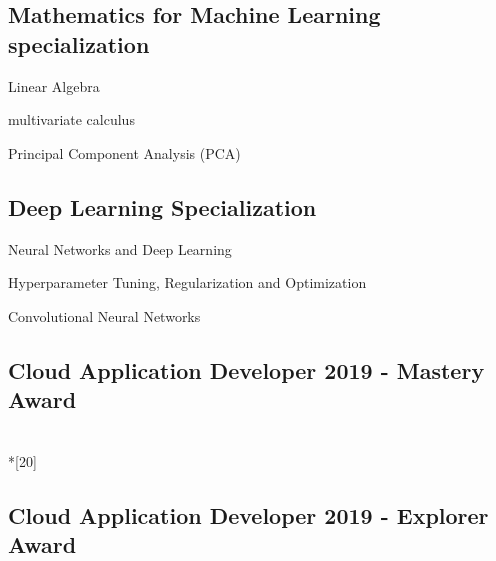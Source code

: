 \documentclass[letter,10pt]{article}
\begin{document}
\subsection{Mathematics for Machine Learning specialization}
\begin{zitemize}

\item Linear Algebra 
\item multivariate calculus 
\item Principal Component Analysis (PCA)

\end{zitemize}

\subsection{Deep Learning Specialization}
\begin{zitemize}

\item Neural Networks and Deep Learning
\item Hyperparameter Tuning, Regularization and Optimization
\item Convolutional Neural Networks

\end{zitemize}


\subsection{Cloud Application Developer 2019 - Mastery Award} \\*[20]


\subsection{Cloud Application Developer 2019 - Explorer Award}
\end{document}
